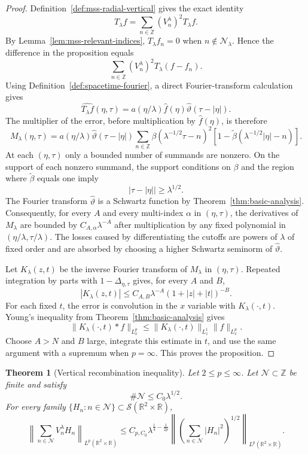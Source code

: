 \documentclass[11pt]{article}
\numberwithin{equation}{section}
\newtheorem{theorem}{Theorem}[section]
\theoremstyle{definition}
\theoremstyle{remark}
\newcommand{\R}{\mathbb R}
\newcommand{\Z}{\mathbb Z}
\newcommand{\Sch}{\mathcal S}
\begin{document}
\begin{proof}
Definition~\ref{def:mss-radial-vertical} gives the exact identity
\[
T_\lambda f=\sum_{n\in\Z}(V_n^\lambda)^2T_\lambda f.
\]
By Lemma~\ref{lem:mss-relevant-indices}, $T_\lambda f_n=0$ when $n\notin\mathcal N_\lambda$.  Hence the difference in the proposition equals
\[
\sum_{n\in\Z}(V_n^\lambda)^2T_\lambda(f-f_n).
\]
Using Definition~\ref{def:spacetime-fourier}, a direct Fourier-transform calculation gives
\[
\widehat{T_\lambda f}(\eta,\tau)
=a(\eta/\lambda)\widehat f(\eta)
\widehat\vartheta(\tau-|\eta|).
\]
The multiplier of the error, before multiplication by $\widehat f(\eta)$, is therefore
\[
M_\lambda(\eta,\tau)
=a(\eta/\lambda)\widehat\vartheta(\tau-|\eta|)
\sum_{n\in\Z}\beta(\lambda^{-1/2}\tau-n)^2
\left[1-\widetilde\beta(\lambda^{-1/2}|\eta|-n)\right].
\]
At each $(\eta,\tau)$ only a bounded number of summands are nonzero.  On the support of each nonzero summand, the support conditions on $\beta$ and the region where $\widetilde\beta$ equals one imply
\[
|\tau-|\eta||\ge\lambda^{1/2}.
\]
The Fourier transform $\widehat\vartheta$ is a Schwartz function by Theorem~\ref{thm:basic-analysis}.  Consequently, for every $A$ and every multi-index $\alpha$ in $(\eta,\tau)$, the derivatives of $M_\lambda$ are bounded by $C_{A,\alpha}\lambda^{-A}$ after multiplication by any fixed polynomial in $(\eta/\lambda,\tau/\lambda)$.  The losses caused by differentiating the cutoffs are powers of $\lambda$ of fixed order and are absorbed by choosing a higher Schwartz seminorm of $\widehat\vartheta$.

Let $K_\lambda(z,t)$ be the inverse Fourier transform of $M_\lambda$ in $(\eta,\tau)$.  Repeated integration by parts with $1-\Delta_{\eta,\tau}$ gives, for every $A$ and $B$,
\[
|K_\lambda(z,t)|
\le C_{A,B}\lambda^{-A}(1+|z|+|t|)^{-B}.
\]
For each fixed $t$, the error is convolution in the $x$ variable with $K_\lambda(\cdot,t)$.  Young's inequality from Theorem~\ref{thm:basic-analysis} gives
\[
\|K_\lambda(\cdot,t)*f\|_{L^p_x}
\le\|K_\lambda(\cdot,t)\|_{L^1_z}\|f\|_{L^p_x}.
\]
Choose $A>N$ and $B$ large, integrate this estimate in $t$, and use the same argument with a supremum when $p=\infty$.  This proves the proposition.
\end{proof}

\begin{theorem}[Vertical recombination inequality]\label{thm:mss-vertical-recombination}
Let $2\le p\le\infty$.  Let $\mathcal N\subset\Z$ be finite and satisfy
\[
\#\mathcal N\le C_0\lambda^{1/2}.
\]
For every family $\{H_n:n\in\mathcal N\}\subset\Sch(\R^2\times\R)$,
\[
\left\|\sum_{n\in\mathcal N}V_n^\lambda H_n\right\|_{L^p(\R^2\times\R)}
\le C_{p,C_0}\lambda^{\frac14-\frac1{2p}}
\left\|\left(\sum_{n\in\mathcal N}|H_n|^2\right)^{1/2}\right\|_{L^p(\R^2\times\R)}.
\]
\end{theorem}
\end{document}
